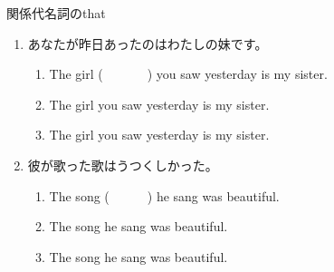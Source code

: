 \documentclass[aspectratio=169,xcolor={dvipsnames,table}]{beamer}
\begin{document}
\begin{frame}[plain]{関係代名詞のthat}
 \begin{enumerate}
  \item<1-> あなたが昨日あったのはわたしの妹です。
       \begin{enumerate}
	\item<1-> The girl (~~~~~~~) you saw yesterday is my sister.
	\item<2->  The girl  you saw yesterday is my sister.
	\item<5->  The girl  you saw yesterday is my sister.
	\end{enumerate}
  \item<1-> 彼が歌った歌はうつくしかった。
	\begin{enumerate}
	 \item<1-> The song (~~~~~~) he sang was beautiful.
	 \item<3-> The song  he sang was beautiful.
	 \item<6-> The song  he sang was beautiful.
       \end{enumerate}
 \end{enumerate}

\end{frame}
\end{document}
